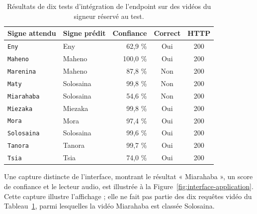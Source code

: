\begin{table}[ht]
\centering
\small
\caption{Résultats de dix tests d'intégration de l'endpoint sur des vidéos du signeur réservé au test.}
\label{tab:tests-integration}
\begin{tabular}{|l|l|r|c|c|}
\hline
Signe attendu & Signe prédit & Confiance & Correct & HTTP \\
\hline
\texttt{Eny} & Eny & 62,9 \% & Oui & 200 \\
\texttt{Maheno} & Maheno & 100,0 \% & Oui & 200 \\
\texttt{Marenina} & Maheno & 87,8 \% & Non & 200 \\
\texttt{Maty} & Solosaina & 99,8 \% & Non & 200 \\
\texttt{Miarahaba} & Solosaina & 54,6 \% & Non & 200 \\
\texttt{Miezaka} & Miezaka & 99,8 \% & Oui & 200 \\
\texttt{Mora} & Mora & 97,4 \% & Oui & 200 \\
\texttt{Solosaina} & Solosaina & 99,6 \% & Oui & 200 \\
\texttt{Tanora} & Tanora & 99,7 \% & Oui & 200 \\
\texttt{Tsia} & Tsia & 74,0 \% & Oui & 200 \\
\hline
\end{tabular}
\end{table}

Une capture distincte de l'interface, montrant le résultat « Miarahaba », un score de confiance et le lecteur audio, est illustrée à la Figure~\ref{fig:interface-application}. Cette capture illustre l'affichage ; elle ne fait pas partie des dix requêtes vidéo du Tableau~\ref{tab:tests-integration}, parmi lesquelles la vidéo Miarahaba est classée Solosaina.